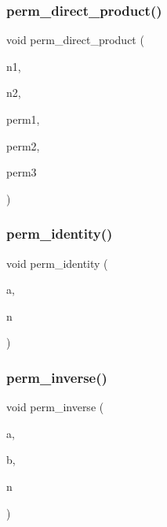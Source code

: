 \subsubsection{\texorpdfstring{perm\+\_\+direct\+\_\+product()}{perm\_direct\_product()}}
{\footnotesize\ttfamily void perm\+\_\+direct\+\_\+product (\begin{DoxyParamCaption}\item[{\mbox{\hyperlink{galois_8h_a09fddde158a3a20bd2dcadb609de11dc}{I\+NT}}}]{n1,  }\item[{\mbox{\hyperlink{galois_8h_a09fddde158a3a20bd2dcadb609de11dc}{I\+NT}}}]{n2,  }\item[{\mbox{\hyperlink{galois_8h_a09fddde158a3a20bd2dcadb609de11dc}{I\+NT}} $\ast$}]{perm1,  }\item[{\mbox{\hyperlink{galois_8h_a09fddde158a3a20bd2dcadb609de11dc}{I\+NT}} $\ast$}]{perm2,  }\item[{\mbox{\hyperlink{galois_8h_a09fddde158a3a20bd2dcadb609de11dc}{I\+NT}} $\ast$}]{perm3 }\end{DoxyParamCaption})}

\mbox{\label{combinatorics_8_c_aebc54d3f9c31f253ae53e3eb3b386208}} 
\subsubsection{\texorpdfstring{perm\+\_\+identity()}{perm\_identity()}}
{\footnotesize\ttfamily void perm\+\_\+identity (\begin{DoxyParamCaption}\item[{\mbox{\hyperlink{galois_8h_a09fddde158a3a20bd2dcadb609de11dc}{I\+NT}} $\ast$}]{a,  }\item[{\mbox{\hyperlink{galois_8h_a09fddde158a3a20bd2dcadb609de11dc}{I\+NT}}}]{n }\end{DoxyParamCaption})}

\mbox{\label{combinatorics_8_c_ab7f02d1e2e257e1118eae354ab16d447}} 
\subsubsection{\texorpdfstring{perm\+\_\+inverse()}{perm\_inverse()}}
{\footnotesize\ttfamily void perm\+\_\+inverse (\begin{DoxyParamCaption}\item[{\mbox{\hyperlink{galois_8h_a09fddde158a3a20bd2dcadb609de11dc}{I\+NT}} $\ast$}]{a,  }\item[{\mbox{\hyperlink{galois_8h_a09fddde158a3a20bd2dcadb609de11dc}{I\+NT}} $\ast$}]{b,  }\item[{\mbox{\hyperlink{galois_8h_a09fddde158a3a20bd2dcadb609de11dc}{I\+NT}}}]{n }\end{DoxyParamCaption})}

